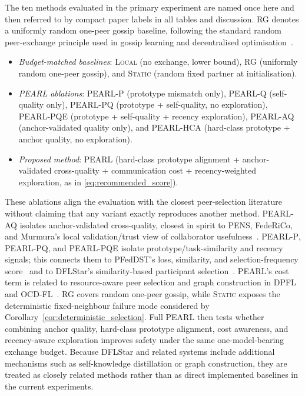 \documentclass[conference]{IEEEtran}
\begin{document}
The ten methods evaluated in the primary experiment are named once here and then referred to by compact paper labels in all tables and discussion. \textsc{RG} denotes a uniformly random one-peer gossip baseline, following the standard random peer-exchange principle used in gossip learning and decentralised optimisation~\cite{ormandi2013gossip,hegedus2019gossip,koloskova2019choco}.
\begin{itemize}
    \item \emph{Budget-matched baselines}: \textsc{Local} (no exchange, lower bound), \textsc{RG} (uniformly random one-peer gossip), and \textsc{Static} (random fixed partner at initialisation).
    \item \emph{PEARL ablations}: \textsc{PEARL-P} (prototype mismatch only), \textsc{PEARL-Q} (self-quality only), \textsc{PEARL-PQ} (prototype + self-quality, no exploration), \textsc{PEARL-PQE} (prototype + self-quality + recency exploration), \textsc{PEARL-AQ} (anchor-validated quality only), and \textsc{PEARL-HCA} (hard-class prototype + anchor quality, no exploration).
    \item \emph{Proposed method}: \textsc{PEARL} (hard-class prototype alignment + anchor-validated cross-quality + communication cost + recency-weighted exploration, as in \eqref{eq:recommended_score}).
\end{itemize}

These ablations align the evaluation with the closest peer-selection literature without claiming that any variant exactly reproduces another method. \textsc{PEARL-AQ} isolates anchor-validated cross-quality, closest in spirit to PENS, FedeRiCo, and Murmura's local validation/trust view of collaborator usefulness~\cite{onoszko2021pens,sui2022federico,rangwala2025murmura}. \textsc{PEARL-P}, \textsc{PEARL-PQ}, and \textsc{PEARL-PQE} isolate prototype/task-similarity and recency signals; this connects them to PFedDST's loss, similarity, and selection-frequency score~\cite{fan2025pfeddst} and to DFLStar's similarity-based participant selection~\cite{soltani2024dflstar}. PEARL's cost term is related to resource-aware peer selection and graph construction in DPFL and OCD-FL~\cite{kharrat2024dpfl,masmoudi2024ocdfl}. \textsc{RG} covers random one-peer gossip, while \textsc{Static} exposes the deterministic fixed-neighbour failure mode considered by Corollary~\ref{cor:deterministic_selection}. Full \textsc{PEARL} then tests whether combining anchor quality, hard-class prototype alignment, cost awareness, and recency-aware exploration improves safety under the same one-model-bearing exchange budget. Because DFLStar and related systems include additional mechanisms such as self-knowledge distillation or graph construction, they are treated as closely related methods rather than as direct implemented baselines in the current experiments.
\end{document}
